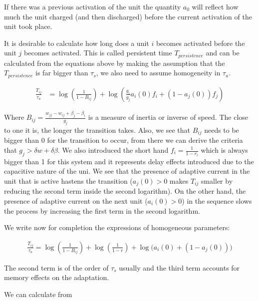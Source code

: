 \documentclass[10pt,a4paper]{article}
\begin{document}
If there was a previous activation of the unit the quantity $a_0$ will reflect how much the unit charged (and then discharged) before the current activation of the unit took place. 

It is desirable to calculate how long does a unit $i$ becomes activated before the unit $j$ becomes activated. This is called persistent time $T_{persistence}$ and can be calculated from the equations above by making the assumption that the $T_{persistence}$ is far bigger than $\tau_s$, we also need to assume homogeneity in $\tau_a$.

\begin{align*}
\frac{T_{ij}}{\tau_a} &= \log \left(\frac{1}{1 - B_{ij}} \right) +\log \left( \frac{g_i}{g_j}a_i(0)f_i + (1 - a_j(0))f_j \right) 
\end{align*}

Where $B_{ij} = \frac{w_{jj} - w_{ij} + \beta_j - \beta_i}{g_j}$ is a measure of inertia or inverse of speed. The close to one it is, the longer the transition takes. Also, we see that $B_{ij}$ needs to be bigger than 0 for the transition to occur, from there we can derive the criteria that $g_j > \delta w + \delta \beta$. We also introduced the short hand $f_i = \frac{1}{1 - r_i}$ which is always bigger than 1 for this system and it represents delay effects introduced due to the capacitive nature of the uni.  We see that the presence of adaptive current in the unit that is active hastens the transition ($a_j(0) > 0$  makes $T_{ij}$ smaller by reducing the second term inside the second logarithm). On the other hand, the presence of adaptive current on the next unit ($a_i(0) > 0$) in the sequence slows the process by increasing the first term in the second logarithm. 

We write now for completion the expressions of homogeneous parameters:

\begin{align*}
\frac{T_{ij}}{\tau_a} = \log \left(\frac{1}{1 - B_{ij}} \right) + \log \left( \frac{1}{1 - r} \right) + \log \bigg( a_i(0) + (1 - a_j(0)) \bigg) 
\end{align*}

The second term is of the order of $\tau_s$ usually and the third term accounts for memory effects on the adaptation.

We can calculate from 
\end{document}
